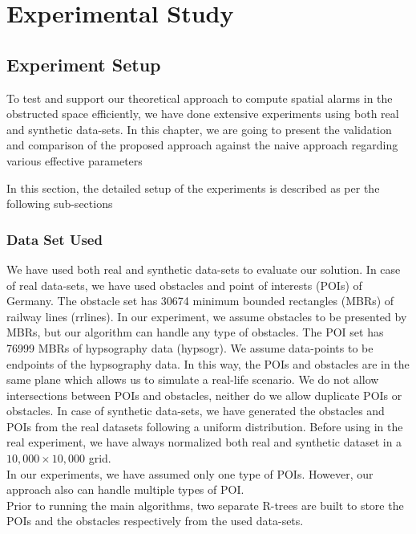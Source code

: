 \chapter{Experimental Study}
\section{\label{sec:exp}Experiment Setup}
\label{sec:exp}
To test and support our theoretical approach to compute spatial alarms in the obstructed space efficiently, we have done extensive experiments using both real and synthetic data-sets. In this chapter, we are going to present the validation and comparison of the proposed approach against the naive approach regarding various effective parameters

In this section, the detailed setup of the experiments is described as per the following sub-sections
\subsection{Data Set Used}

We have used both real and synthetic data-sets to evaluate our solution. In case of real data-sets, we have used obstacles and point of interests (POIs) of Germany. The obstacle set has 30674 minimum bounded rectangles (MBRs) of railway lines (rrlines). In our experiment, we assume obstacles to be presented by MBRs, but our algorithm can handle any type of obstacles. The POI set has 76999 MBRs of hypsography data (hypsogr). We assume data-points to be endpoints of the hypsography data. In this way, the POIs and obstacles are in the same plane which allows us to simulate a real-life scenario. We do not allow intersections between POIs and obstacles, neither do we allow duplicate POIs or obstacles. In case of synthetic data-sets, we have generated the obstacles and POIs from the real datasets following a uniform distribution. Before using in the real experiment, we have always normalized both real and synthetic dataset in a $  10,000 \times 10,000 $ grid.\\
In our experiments, we have assumed only one type of POIs. However, our approach also can handle multiple types of POI. \\
Prior to  running the main algorithms, two separate R-trees are built to store the POIs and the obstacles respectively from the used data-sets.\\





